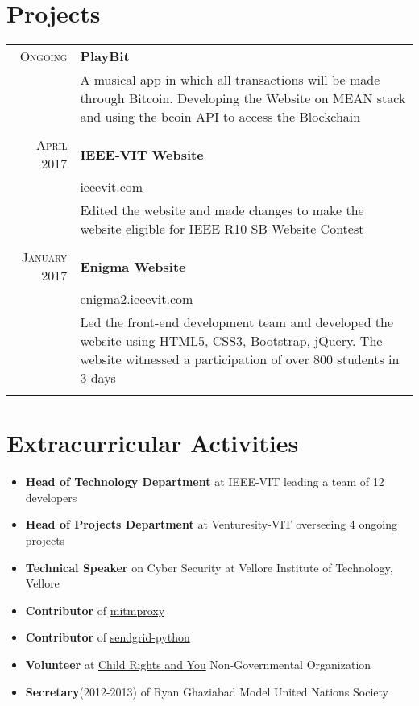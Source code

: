 \documentclass[a4paper,1pt]{article}
\begin{document}
\section{Projects}
\begin{tabular}{r|p{11cm}}

\textsc{Ongoing} & \textbf{PlayBit} \\&\footnotesize{A musical app in which all transactions will be made through Bitcoin. Developing the Website on MEAN stack and using the \href{http://bcoin.io/}{bcoin API} to access the Blockchain}\\\multicolumn{2}{c}{}\\

\textsc{April 2017} & \textbf{IEEE-VIT Website} \\&\href{https://ieeevit.com}{ieeevit.com}\\&\footnotesize{Edited the website and made changes to make the website eligible for \href{http://sac.ieeer10.org/website-contest/}{IEEE R10 SB Website Contest}}\\\multicolumn{2}{c}{} \\
 \textsc{January 2017} & \textbf{Enigma Website} \\&\href{http://enigma2.ieeevit.com/}{enigma2.ieeevit.com}\\&\footnotesize{Led the front-end development team and developed the website using HTML5, CSS3, Bootstrap, jQuery. The website witnessed a participation of over 800 students in 3 days}\\\multicolumn{2}{c}{} 

\end{tabular}

\section{Extracurricular Activities}{\raggedbottom}
\begin{itemize}
    \item \textbf{Head of Technology Department} at IEEE-VIT leading a team of 12 developers
\item \textbf{Head of Projects Department} at Venturesity-VIT overseeing 4 ongoing projects
\item \textbf{Technical Speaker} on Cyber Security at Vellore Institute of Technology, Vellore
\item \textbf{Contributor} of \href{https://github.com/mitmproxy/mitmproxy}{mitmproxy}
\item \textbf{Contributor} of \href{https://github.com/sendgrid/sendgrid-python}{sendgrid-python}
\item \textbf{Volunteer} at \href{https://www.cry.org/}{Child Rights and You} Non-Governmental Organization
\item \textbf{Secretary}(2012-2013) of Ryan Ghaziabad Model United Nations Society
\end{itemize}
\end{document}

